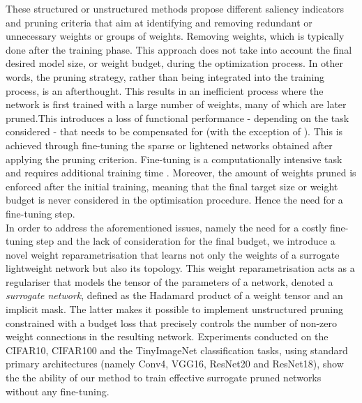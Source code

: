 These structured or unstructured methods propose different saliency indicators
and pruning criteria that aim at identifying and removing redundant or
unnecessary weights or groups of weights. Removing weights, which is typically
done after the training phase. This approach does not take into account the
final desired model size, or weight budget, during the optimization process. In
other words, the pruning strategy, rather than being integrated into the
training process, is an afterthought. This results in an inefficient process
where the network is first trained with a large number of weights, many of which
are later pruned.This introduces a loss of functional performance - depending on
the task considered - that needs to be compensated for (with the exception of
\cite{DBLP:conf/icml/KangH20}). This is achieved through fine-tuning the sparse
or lightened networks obtained after applying the pruning criterion. Fine-tuning
is a computationally intensive task and requires additional training time
\cite{DBLP:conf/nips/HanPTD15,DBLP:journals/corr/HanMD15}. Moreover, the amount
of weights pruned is enforced after the initial training, meaning that the final
target size or weight budget is never considered in the optimisation procedure.
Hence the need for a fine-tuning step. \\


In order to address the aforementioned issues, namely the need for a costly
fine-tuning step and the lack of consideration for the final budget, we
introduce a novel weight reparametrisation that learns not only the weights of a
surrogate lightweight network but also its topology. This weight
reparametrisation acts as a regulariser that models the tensor of the parameters
of a network, denoted a \textit{surrogate network}, defined as the Hadamard
product of a weight tensor and an implicit mask. The latter makes it possible to
implement unstructured pruning constrained with a budget loss that precisely
controls the number of non-zero weight connections in the resulting network.
Experiments conducted on the CIFAR10, CIFAR100 and the TinyImageNet
classification tasks, using standard primary architectures (namely Conv4, VGG16,
ResNet20 and ResNet18), show the the ability of our method to train effective
surrogate pruned networks without any fine-tuning.


